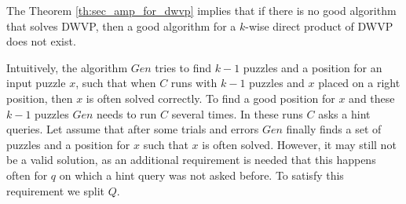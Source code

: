 %
The Theorem \ref{th:sec_amp_for_dwvp} implies that if there is no good algorithm that solves DWVP,
then a good algorithm for a $k$-wise direct product of DWVP does not exist.

Intuitively, the algorithm $Gen$ tries to find $k-1$ puzzles and a position for an input puzzle $x$, such that
when $C$ runs with $k-1$ puzzles and $x$ placed on a right position, then $x$ is often solved correctly.
To find a good position for $x$ and these $k-1$ puzzles $Gen$ needs to run $C$ several times.
In these runs $C$ asks a hint queries.
Let assume that after some trials and errors $Gen$ finally finds a set of puzzles and a position for $x$ such that $x$ is often solved.
However, it may still not be a valid solution, as an additional requirement is needed that this happens often for $q$
on which a hint query was not asked before. To satisfy this requirement we split $Q$.
